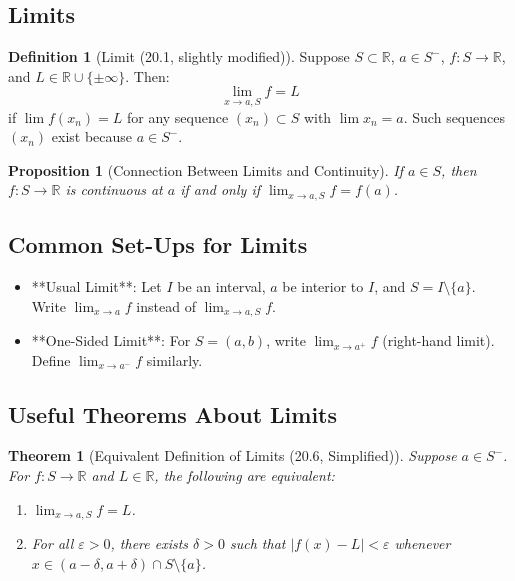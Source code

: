 \documentclass[9pt]{article}
\theoremstyle{definition}
\newtheorem{definition}{Definition}
\theoremstyle{plain}
\newtheorem{theorem}{Theorem}
\newtheorem{proposition}{Proposition}
\begin{document}
\subsection*{Limits}
\begin{definition}[Limit (20.1, slightly modified)]
Suppose \( S \subset \mathbb{R} \), \( a \in S^- \), \( f : S \to \mathbb{R} \), and \( L \in \mathbb{R} \cup \{\pm \infty\} \). Then:
\[
\lim_{x \to a, S} f = L
\]
if \( \lim f(x_n) = L \) for any sequence \( (x_n) \subset S \) with \( \lim x_n = a \). Such sequences \( (x_n) \) exist because \( a \in S^- \).
\end{definition}

\begin{proposition}[Connection Between Limits and Continuity]
If \( a \in S \), then \( f : S \to \mathbb{R} \) is continuous at \( a \) if and only if \( \lim_{x \to a, S} f = f(a) \).
\end{proposition}

\subsection*{Common Set-Ups for Limits}
\begin{itemize}
    \item **Usual Limit**: Let \( I \) be an interval, \( a \) be interior to \( I \), and \( S = I \setminus \{a\} \). Write \( \lim_{x \to a} f \) instead of \( \lim_{x \to a, S} f \).
    \item **One-Sided Limit**: For \( S = (a, b) \), write \( \lim_{x \to a^+} f \) (right-hand limit). Define \( \lim_{x \to a^-} f \) similarly.
\end{itemize}

\subsection*{Useful Theorems About Limits}
\begin{theorem}[Equivalent Definition of Limits (20.6, Simplified)]
Suppose \( a \in S^- \). For \( f : S \to \mathbb{R} \) and \( L \in \mathbb{R} \), the following are equivalent:
\begin{enumerate}
    \item \( \lim_{x \to a, S} f = L \).
    \item For all \( \varepsilon > 0 \), there exists \( \delta > 0 \) such that \( |f(x) - L| < \varepsilon \) whenever \( x \in (a - \delta, a + \delta) \cap S \setminus \{a\} \).
\end{enumerate}
\end{theorem}
\end{document}
